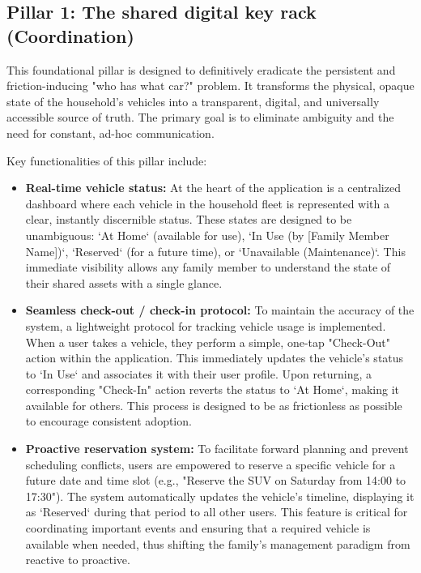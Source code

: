 \subsection{Pillar 1: The shared digital key rack (Coordination)}

This foundational pillar is designed to definitively eradicate the persistent and friction-inducing "who has what car?" problem. It transforms the physical, opaque state of the household's vehicles into a transparent, digital, and universally accessible source of truth. The primary goal is to eliminate ambiguity and the need for constant, ad-hoc communication.

\textgap

Key functionalities of this pillar include:
\begin{itemize}
    \item \textbf{Real-time vehicle status:} At the heart of the application is a centralized dashboard where each vehicle in the household fleet is represented with a clear, instantly discernible status. These states are designed to be unambiguous: `At Home` (available for use), `In Use (by [Family Member Name])`, `Reserved` (for a future time), or `Unavailable (Maintenance)`. This immediate visibility allows any family member to understand the state of their shared assets with a single glance.

    \textgap

    \item \textbf{Seamless check-out / check-in protocol:} To maintain the accuracy of the system, a lightweight protocol for tracking vehicle usage is implemented. When a user takes a vehicle, they perform a simple, one-tap "Check-Out" action within the application. This immediately updates the vehicle's status to `In Use` and associates it with their user profile. Upon returning, a corresponding "Check-In" action reverts the status to `At Home`, making it available for others. This process is designed to be as frictionless as possible to encourage consistent adoption.

    \textgap

    \item \textbf{Proactive reservation system:} To facilitate forward planning and prevent scheduling conflicts, users are empowered to reserve a specific vehicle for a future date and time slot (e.g., "Reserve the SUV on Saturday from 14:00 to 17:30"). The system automatically updates the vehicle's timeline, displaying it as `Reserved` during that period to all other users. This feature is critical for coordinating important events and ensuring that a required vehicle is available when needed, thus shifting the family's management paradigm from reactive to proactive.
\end{itemize}

